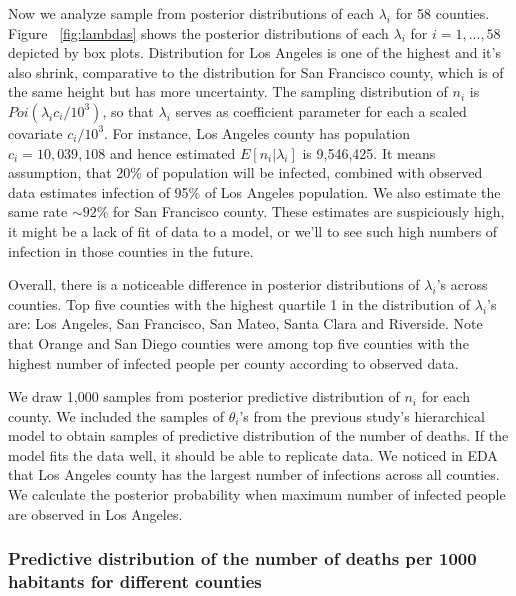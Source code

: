 \documentclass[11pt,twocolumn]{asaproc}
\begin{document}
Now we analyze sample from posterior distributions of each $\lambda_i$ for 58 counties. Figure ~\ref{fig:lambdas} shows the posterior distributions of each $\lambda_i$ for $i = 1, ..., 58$ depicted by box plots. Distribution for Los Angeles is one of the highest and it's also shrink, comparative to the distribution for San Francisco county, which is of the same height but has more uncertainty. The sampling distribution of $n_i$ is $Poi(\lambda_i c_i / 10^3)$, so that $\lambda_i$ serves as coefficient parameter for each a scaled covariate $c_i/10^3$. For instance, Los Angeles county has population $c_i = 10,039,108$ and hence estimated $E[n_i|\lambda_i]$ is 9,546,425. It means assumption, that 20\% of population will be infected, combined with observed data estimates infection of 95\% of Los Angeles population. We also estimate the same rate $\sim 92\%$ for San Francisco county. These estimates are suspiciously high, it might be a lack of fit of data to a model, or we'll to see such high numbers of infection in those counties in the future.

Overall, there is a noticeable difference in posterior distributions of $\lambda_i$'s across counties. Top five counties with the highest quartile 1 in the distribution of $\lambda_i$'s are: Los Angeles, San Francisco, San Mateo, Santa Clara and Riverside. Note that Orange and San Diego counties were among top five counties with the highest number of infected people per county according to observed data. 



We draw 1,000 samples from posterior predictive distribution of $n_i$ for each county. We included the samples of $\theta_i$'s from the previous study's hierarchical model to obtain samples of predictive distribution of the number of deaths. If the model fits the data well, it should be able to replicate data. We noticed in EDA that Los Angeles county has the largest number of infections across all counties. We calculate the posterior probability when maximum number of infected people are observed in Los Angeles. 


 





\subsubsection{Predictive distribution of the number of deaths per 1000 habitants for different counties}
\end{document}
